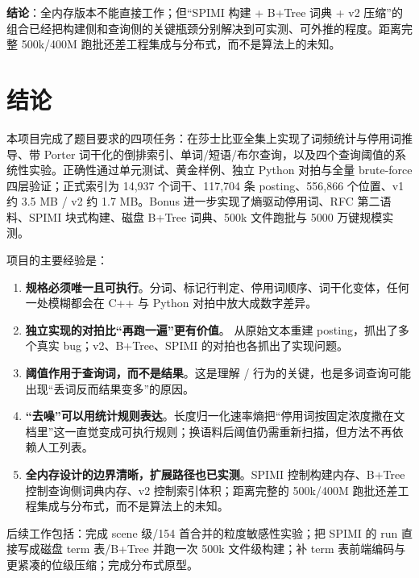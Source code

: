 \textbf{结论}：全内存版本不能直接工作；但“SPIMI 构建 + B+Tree 词典 + v2 压缩”的组合已经把构建侧和查询侧的关键瓶颈分别解决到可实测、可外推的程度。距离完整 500k/400M 跑批还差工程集成与分布式，而不是算法上的未知。

\section{结论}

本项目完成了题目要求的四项任务：在莎士比亚全集上实现了词频统计与停用词推导、带 Porter 词干化的倒排索引、单词/短语/布尔查询，以及四个查询阈值的系统性实验。正确性通过单元测试、黄金样例、独立 Python 对拍与全量 brute-force 四层验证；正式索引为 14,937 个词干、117,704 条 posting、556,866 个位置、v1 约 3.5 MB / v2 约 1.7 MB。Bonus 进一步实现了熵驱动停用词、RFC 第二语料、SPIMI 块式构建、磁盘 B+Tree 词典、500k 文件跑批与 5000 万键规模实测。

项目的主要经验是：

\begin{enumerate}
  \item \textbf{规格必须唯一且可执行}。分词、标记行判定、停用词顺序、词干化变体，任何一处模糊都会在 C++ 与 Python 对拍中放大成数字差异。
  \item \textbf{独立实现的对拍比“再跑一遍”更有价值}。 从原始文本重建 posting，抓出了多个真实 bug；v2、B+Tree、SPIMI 的对拍也各抓出了实现问题。
  \item \textbf{阈值作用于查询词，而不是结果}。这是理解 / 行为的关键，也是多词查询可能出现“丢词反而结果变多”的原因。
  \item \textbf{“去噪”可以用统计规则表达}。长度归一化速率熵把“停用词按固定浓度撒在文档里”这一直觉变成可执行规则；换语料后阈值仍需重新扫描，但方法不再依赖人工列表。
  \item \textbf{全内存设计的边界清晰，扩展路径也已实测}。SPIMI 控制构建内存、B+Tree 控制查询侧词典内存、v2 控制索引体积；距离完整的 500k/400M 跑批还差工程集成与分布式，而不是算法上的未知。
\end{enumerate}

后续工作包括：完成 scene 级/154 首合并的粒度敏感性实验；把 SPIMI 的 run 直接写成磁盘 term 表/B+Tree 并跑一次 500k 文件级构建；补 term 表前端编码与更紧凑的位级压缩；完成分布式原型。
